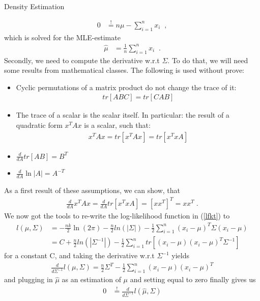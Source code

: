 \documentclass[
ngerman,
]{tudaexercise}
\newcommand{\sni}{\sum_{i=1}^{n}}
\begin{document}
\begin{task}{Density Estimation}
\begin{subtask}
			\begin{align*}
				0&\stackrel{!}{=}n\mu-\sni x_i\;\;,
			\end{align*}
			which is solved for the MLE-estimate
			\begin{align}
				\hat{\mu}&=\frac{1}{n}\sni x_i\;\;.
			\end{align}
			Secondly, we need to compute the derivative w.r.t $\Sigma$. To do that, we will need some results from mathematical classes. The following is used without prove:
			\begin{itemize}
				\item Cyclic permutations of a matrix product do not change the trace of it:\begin{align*}
					tr\left[ ABC\right] = tr\left[ CAB\right] 
				\end{align*}
				\item The trace of a scalar is the scalar itself. In particular: the result of a quadratic form $x^T Ax$ is a scalar, such that:\begin{align*}
					x^T Ax=tr\left[ x^TAx\right] =tr\left[ x^TxA\right] 
				\end{align*}
				\item $\frac{d}{dA}tr\left[ AB\right] =B^T$
				\item $\frac{d}{dA}\ln|A|=A^{-T}$
			\end{itemize}
		As a first result of these assumptions, we can show, that\begin{align*}
			\frac{d}{dA}x^T Ax=\frac{d}{dA}tr\left[ x^T xA\right] =\left[ xx^T\right] ^T=xx^T\;.
		\end{align*} 
		We now got the tools to re-write the log-likelihood function in (\ref{lfkt}) to
		\begin{align*}
			l(\mu,\Sigma)&=-\frac{nk}{2}\ln(2\pi)-\frac{n}{2}ln(|\Sigma|)-\frac{1}{2}\sni (x_i-\mu)^T\Sigma(x_i-\mu)\\&=C+\frac{n}{2}ln(|\Sigma^{-1}|)-\frac{1}{2}\sni tr\left[ (x_i-\mu)(x_i-\mu)^T \Sigma^{-1}\right] 
		\end{align*}
		for a constant C, and taking the derivative w.r.t $\Sigma^{-1}$ yields
		\begin{align*}
			\frac{d}{d\Sigma^{-1}}l(\mu,\Sigma)=\frac{n}{2}\Sigma^T-\frac{1}{2}\sni(x_i-\mu)(x_i-\mu)^T
		\end{align*}
		and plugging in $\hat{\mu}$ as an estimation of $\mu$ and setting equal to zero finally gives us
		\begin{align*}
			0&\stackrel{!}{=}\frac{d}{d\Sigma^{-1}}l(\hat{\mu},\Sigma)\\

\end{align*}
\end{subtask}
\end{task}
\end{document}
